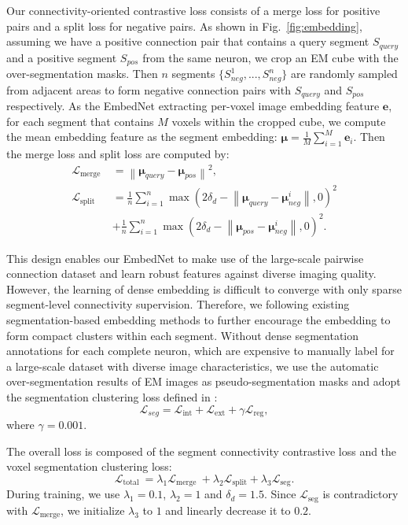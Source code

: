 Our connectivity-oriented contrastive loss consists of a merge loss for positive pairs and a split loss for negative pairs. 
As shown in Fig.~\ref{fig:embedding}, assuming we have a positive connection pair that contains a query segment $S_{query}$ and a positive segment $S_{pos}$ from the same neuron, we crop an EM cube with the over-segmentation masks. Then $n$ segments $\{S_{neg}^1,...,S_{neg}^n\}$ are randomly sampled from adjacent areas to form negative connection pairs with $S_{query}$ and $S_{pos}$ respectively. 
As the EmbedNet extracting per-voxel image embedding feature $\mathbf{e}$, for each segment that contains $M$ voxels within the cropped cube, we compute the mean embedding feature as the segment embedding: $\bm{\mu} = \frac{1}{M} \sum^{M}_{i=1} \mathbf{e}_i$. 
%
Then the merge loss and split loss are computed by:
\begin{equation}
    \begin{aligned}
     \mathcal{L}_{\text {merge }} &=\left\|\bm{\mu}_{query}-\bm{\mu}_{pos}\right\|^2, \\
     \mathcal{L}_{\text {split}} &=\frac{1}{n}\sum_{i=1}^n\max \left(2 \delta_d-\left\|\bm{\mu}_{query}-\bm{\mu}_{neg}^i\right\|, 0\right)^2 \\
    & + \frac{1}{n} \sum_{i=1}^n\max \left(2 \delta_d-\left\|\bm{\mu}_{pos}-\bm{\mu}_{neg}^i\right\|, 0\right)^2.
    \end{aligned}
\end{equation}

This design enables our EmbedNet to make use of the large-scale pairwise connection dataset and learn robust features against diverse imaging quality. 
However, the learning of dense embedding is difficult to converge with only sparse segment-level connectivity supervision. Therefore, we following existing segmentation-based embedding methods to further encourage the embedding to form compact clusters within each segment. 
Without dense segmentation annotations for each complete neuron, which are expensive to manually label for a large-scale dataset with diverse image characteristics, we use the automatic over-segmentation results of EM images as pseudo-segmentation masks and adopt the segmentation clustering loss defined in \cite{lee2021learning}:
\begin{equation}
\label{eq:segmentation-loss}
    \mathcal{L}_{seg} = \mathcal{L}_{\mathrm{int}} + \mathcal{L}_{\mathrm{ext}} + \gamma\mathcal{L}_{\mathrm{reg}},
\end{equation}
%
where $\gamma=0.001$.


The overall loss is composed of the segment connectivity contrastive loss and the voxel segmentation clustering loss:
\begin{equation}\label{eq:overall-loss}
        \mathcal{L}_{\text {total }} = \lambda_1  \mathcal{L}_{\text {merge }} + \lambda_2 \mathcal{L}_{\text {split}} + \lambda_3 \mathcal{L}_{\text {seg}}.
\end{equation}
%
During training, we use $\lambda_1=0.1$, $\lambda_2=1$ and $\delta_d=1.5$. Since $\mathcal{L}_{\text {seg}}$ is contradictory with $\mathcal{L}_{\text {merge}}$, we initialize $\lambda_3$ to $1$ and linearly decrease it to $0.2$.
 

